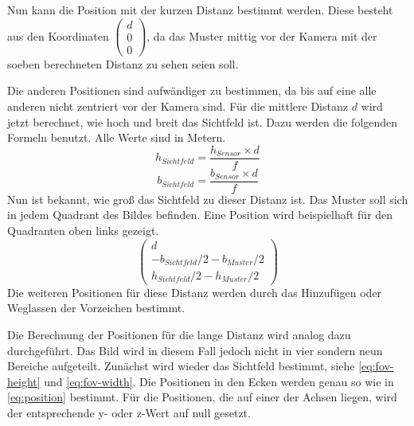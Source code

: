 Nun kann die Position mit der kurzen Distanz bestimmt werden. Diese besteht aus den Koordinaten $\begin{pmatrix}
	d\\ 0\\ 0
\end{pmatrix}$, da das Muster mittig vor der Kamera mit der soeben berechneten Distanz zu sehen seien soll.

Die anderen Positionen sind aufwändiger zu bestimmen, da bis auf eine alle anderen nicht zentriert vor der Kamera sind. Für die mittlere Distanz $d$ wird jetzt berechnet, wie hoch und breit das Sichtfeld ist. Dazu werden die folgenden Formeln benutzt. Alle Werte sind in Metern.
\begin{equation}\label{eq:fov-height}
	h_{Sichtfeld} = \frac{h_{Sensor} \times d}{f}
\end{equation}
\begin{equation}\label{eq:fov-width}
	b_{Sichtfeld} = \frac{b_{Sensor} \times d}{f}
\end{equation}
Nun ist bekannt, wie groß das Sichtfeld zu dieser Distanz ist. Das Muster soll sich in jedem Quadrant des Bildes befinden. Eine Position wird beispielhaft für den Quadranten oben links gezeigt.
\begin{equation}\label{eq:position}
	\begin{pmatrix}
		d\\
		-b_{Sichtfeld} / 2 - b_{Muster} / 2\\
		h_{Sichtfeld} / 2 - h_{Muster} / 2
	\end{pmatrix}
\end{equation}
Die weiteren Positionen für diese Distanz werden durch das Hinzufügen oder Weglassen der Vorzeichen bestimmt.

Die Berechnung der Positionen für die lange Distanz wird analog dazu durchgeführt. Das Bild wird in diesem Fall jedoch nicht in vier sondern neun Bereiche aufgeteilt. Zunächst wird wieder das Sichtfeld bestimmt, siehe \autoref{eq:fov-height} und \autoref{eq:fov-width}. Die Positionen in den Ecken werden genau so wie in \autoref{eq:position} bestimmt. Für die Positionen, die auf einer der Achsen liegen, wird der entsprechende y- oder z-Wert auf null gesetzt.

